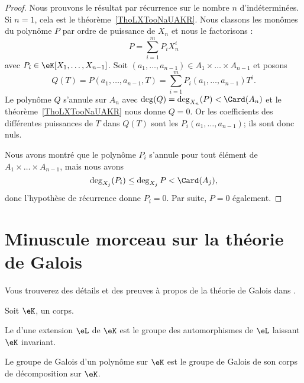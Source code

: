 \begin{proof}
    Nous prouvons le résultat par récurrence sur le nombre \( n\) d'indéterminées. Si \( n=1\), cela est le théorème~\ref{ThoLXTooNaUAKR}. Nous classons les monômes du polynôme \( P\) par ordre de puissance de \( X_n\) et nous le factorisons :
    \begin{equation}
        P=\sum_{i=1}^mP_iX_n^i
    \end{equation}
    avec \( P_i\in \eK[X_1,\ldots, X_{n-1}]\). Soit \( (a_1,\ldots, a_{n-1})\in A_1\times \ldots \times A_{n-1}\) et posons
    \begin{equation}
        Q(T)=P(a_1,\ldots, a_{n-1},T)= \sum_{i=1}^mP_i(a_1,\ldots, a_{n-1})T^i.
    \end{equation}
    Le polynôme \( Q\) s'annule sur \( A_n\) avec \( \deg(Q)=\deg_{X_n}(P)<\Card(A_n)\) et le théorème~\ref{ThoLXTooNaUAKR} nous donne \( Q=0\). Or les coefficients des différentes puissances de \( T\) dans \( Q(T) \) sont les \( P_i(a_1,\ldots, a_{n-1})\); ils sont donc nuls.

    Nous avons montré que le polynôme \( P_i\) s'annule pour tout élément de \( A_1\times \ldots \times A_{n-1}\), mais nous avons
    \begin{equation}
        \deg_{X_j}(P_i)\leq \deg_{X_j}P<\Card(A_j),
    \end{equation}
    donc l'hypothèse de récurrence donne \( P_i=0\). Par suite, \( P=0\) également.
\end{proof}

\section{Minuscule morceau sur la théorie de Galois}

Vous trouverez des détails et des preuves à propos de la théorie de Galois dans \cite{GalIEl,rqrNyg}.

\begin{definition}
    Soit $\eK$, un corps.

    Le  d'une extension \( \eL\) de \( \eK\) est le groupe des automorphismes de \( \eL\) laissant \( \eK\) invariant.

    Le groupe de Galois d'un polynôme sur \( \eK\) est le groupe de Galois de son corps de décomposition sur \( \eK\).
\end{definition}

